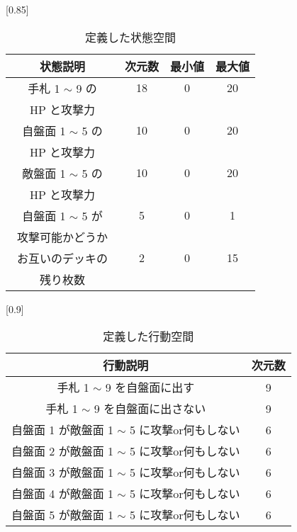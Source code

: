 \documentclass[twocolumn]{jarticle}     %
\begin{document}
\begin{table}[H]
  \centering
  \caption{定義した状態空間}
  \label{table:state}
  \scalebox{0.85}[0.85]{
    \begin{tabular}{|c|c|c|c|}
      \hline
      状態説明                        & 次元数        & 最小値        & 最大値         \\ \hline \hline
      手札 1 $\sim$ 9 の      & 18         & 0          & 20          \\
        HP と攻撃力　& & & \\
      \hline
      自盤面 1 $\sim$ 5 の      & 10         & 0          & 20 \\
      HP と攻撃力　& & & \\
      \hline
      敵盤面 1 $\sim$ 5 の  & 10         & 0          & 20          \\
      HP と攻撃力　& & & \\
      \hline
      自盤面 1 $\sim$ 5 が & 5          & 0          & 1           \\
      攻撃可能かどうか　& & & \\
      \hline
      お互いのデッキの     & 2 & 0 & 15 \\
      残り枚数　& & & \\
       \hline
      \end{tabular}
  }
  \end{table}

  \begin{table}[H]
    \centering
    \caption{定義した行動空間}
    \label{table:action}
    \scalebox{0.9}[0.9]{
      \begin{tabular}{|c|c|}
        \hline
        行動説明                          & 次元数        \\ \hline \hline
        手札 1 $\sim$ 9 を自盤面に出す             & 9          \\ \hline
        手札 1 $\sim$ 9 を自盤面に出さない & 9 \\ \hline
        自盤面 1 が敵盤面 1 $\sim$ 5 に攻撃or何もしない    & 6          \\ \hline
        自盤面 2 が敵盤面 1 $\sim$ 5 に攻撃or何もしない    & 6          \\ \hline
        自盤面 3 が敵盤面 1 $\sim$ 5 に攻撃or何もしない    & 6          \\ \hline
        自盤面 4 が敵盤面 1 $\sim$ 5 に攻撃or何もしない    & 6          \\ \hline
        自盤面 5 が敵盤面 1 $\sim$ 5 に攻撃or何もしない    & 6          \\ \hline
        \end{tabular}
    }
    \end{table}
  
\end{document}
